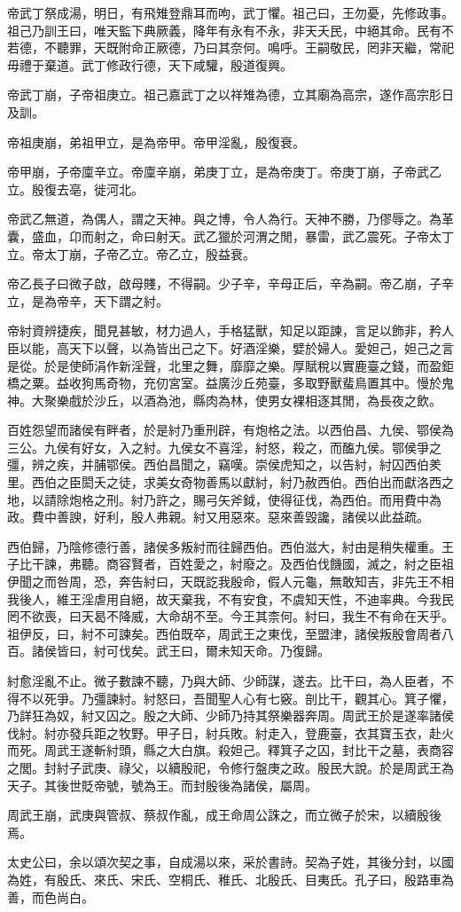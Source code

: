 帝武丁祭成湯，明日，有飛雉登鼎耳而呴，武丁懼。祖己曰，王勿憂，先修政事。祖己乃訓王曰，唯天監下典厥義，降年有永有不永，非天夭民，中絕其命。民有不若德，不聽罪，天既附命正厥德，乃曰其奈何。鳴呼。王嗣敬民，罔非天繼，常祀毋禮于棄道。武丁修政行德，天下咸驩，殷道復興。

帝武丁崩，子帝祖庚立。祖己嘉武丁之以祥雉為德，立其廟為高宗，遂作高宗肜日及訓。

帝祖庚崩，弟祖甲立，是為帝甲。帝甲淫亂，殷復衰。

帝甲崩，子帝廩辛立。帝廩辛崩，弟庚丁立，是為帝庚丁。帝庚丁崩，子帝武乙立。殷復去亳，徙河北。

帝武乙無道，為偶人，謂之天神。與之博，令人為行。天神不勝，乃僇辱之。為革囊，盛血，卬而射之，命曰射天。武乙獵於河渭之閒，暴雷，武乙震死。子帝太丁立。帝太丁崩，子帝乙立。帝乙立，殷益衰。

帝乙長子曰微子啟，啟母賤，不得嗣。少子辛，辛母正后，辛為嗣。帝乙崩，子辛立，是為帝辛，天下謂之紂。

帝紂資辨捷疾，聞見甚敏，材力過人，手格猛獸，知足以距諫，言足以飾非，矜人臣以能，高天下以聲，以為皆出己之下。好酒淫樂，嬖於婦人。愛妲己，妲己之言是從。於是使師涓作新淫聲，北里之舞，靡靡之樂。厚賦稅以實鹿臺之錢，而盈鉅橋之粟。益收狗馬奇物，充仞宮室。益廣沙丘苑臺，多取野獸蜚鳥置其中。慢於鬼神。大聚樂戲於沙丘，以酒為池，縣肉為林，使男女裸相逐其閒，為長夜之飲。

百姓怨望而諸侯有畔者，於是紂乃重刑辟，有炮格之法。以西伯昌、九侯、鄂侯為三公。九侯有好女，入之紂。九侯女不喜淫，紂怒，殺之，而醢九侯。鄂侯爭之彊，辨之疾，并脯鄂侯。西伯昌聞之，竊嘆。崇侯虎知之，以告紂，紂囚西伯羑里。西伯之臣閎夭之徒，求美女奇物善馬以獻紂，紂乃赦西伯。西伯出而獻洛西之地，以請除炮格之刑。紂乃許之，賜弓矢斧鉞，使得征伐，為西伯。而用費中為政。費中善諛，好利，殷人弗親。紂又用惡來。惡來善毀讒，諸侯以此益疏。

西伯歸，乃陰修德行善，諸侯多叛紂而往歸西伯。西伯滋大，紂由是稍失權重。王子比干諫，弗聽。商容賢者，百姓愛之，紂廢之。及西伯伐饑國，滅之，紂之臣祖伊聞之而咎周，恐，奔告紂曰，天既訖我殷命，假人元龜，無敢知吉，非先王不相我後人，維王淫虐用自絕，故天棄我，不有安食，不虞知天性，不迪率典。今我民罔不欲喪，曰天曷不降威，大命胡不至。今王其柰何。紂曰，我生不有命在天乎。祖伊反，曰，紂不可諫矣。西伯既卒，周武王之東伐，至盟津，諸侯叛殷會周者八百。諸侯皆曰，紂可伐矣。武王曰，爾未知天命。乃復歸。

紂愈淫亂不止。微子數諫不聽，乃與大師、少師謀，遂去。比干曰，為人臣者，不得不以死爭。乃彊諫紂。紂怒曰，吾聞聖人心有七竅。剖比干，觀其心。箕子懼，乃詳狂為奴，紂又囚之。殷之大師、少師乃持其祭樂器奔周。周武王於是遂率諸侯伐紂。紂亦發兵距之牧野。甲子日，紂兵敗。紂走入，登鹿臺，衣其寶玉衣，赴火而死。周武王遂斬紂頭，縣之大白旗。殺妲己。釋箕子之囚，封比干之墓，表商容之閭。封紂子武庚、祿父，以續殷祀，令修行盤庚之政。殷民大說。於是周武王為天子。其後世貶帝號，號為王。而封殷後為諸侯，屬周。

周武王崩，武庚與管叔、蔡叔作亂，成王命周公誅之，而立微子於宋，以續殷後焉。

太史公曰，余以頌次契之事，自成湯以來，采於書詩。契為子姓，其後分封，以國為姓，有殷氏、來氏、宋氏、空桐氏、稚氏、北殷氏、目夷氏。孔子曰，殷路車為善，而色尚白。